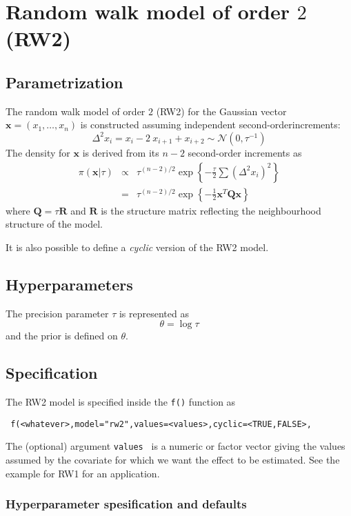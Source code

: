 \documentclass[a4paper,11pt]{article}
\begin{document}
\section*{Random walk model of order $2$ (RW2)}

\subsection*{Parametrization}
The random walk model of order $2$ (RW2) for the Gaussian vector
$\mathbf{x}=(x_1,\dots,x_n)$ is constructed assuming independent
second-orderincrements:
\[
\Delta^2 x_i = x_i-2\ x_{i+1}+x_{i+2}\sim\mathcal{N}(0,\tau^{-1})
\]
The density for $\mathbf{x}$ is derived from its $n-2$ second-order
increments as
\begin{eqnarray}
    \pi(\mathbf{x}|\tau) &\propto& \tau^{(n-2)/2} \exp\left\{-\frac{\tau}{2} \sum (\Delta^2 x_i)^2\right\}\\
    & = &\tau^{(n-2)/2}\exp\left\{-\frac{1}{2}\mathbf{x}^T\mathbf{Q}\mathbf{x} \right\}
\end{eqnarray}
where $\mathbf{Q}=\tau\mathbf{R}$ and $\mathbf{R}$ is the structure
matrix reflecting the neighbourhood structure of the model.

It is also possible to define a {\it cyclic} version of the RW2 model.

\subsection*{Hyperparameters}

The precision parameter $\tau$ is represented as
\begin{displaymath}
    \theta =\log \tau
\end{displaymath}
and the prior is defined on $\theta$.

\subsection*{Specification}

The RW2 model is specified inside the {\tt f()} function as
\begin{verbatim}
 f(<whatever>,model="rw2",values=<values>,cyclic=<TRUE,FALSE>,
\end{verbatim}
The (optional) argument {\tt values } is a numeric or factor vector
giving the values assumed by the covariate for which we want the
effect to be estimated. See the example for RW1 for an application.

\subsubsection*{Hyperparameter spesification and defaults}

\end{document}
